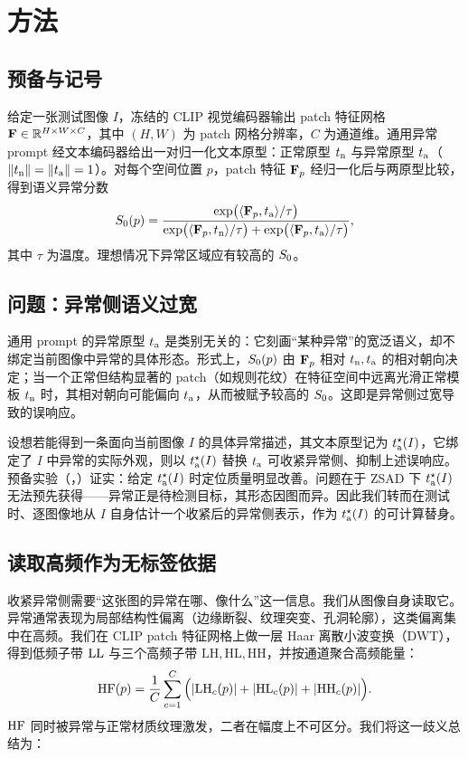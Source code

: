\section{方法}
\label{sec:method}

\subsection{预备与记号}
给定一张测试图像 $I$，冻结的 CLIP 视觉编码器输出 patch 特征网格 $\mathbf{F}\in\mathbb{R}^{H\times W\times C}$，其中 $(H,W)$ 为 patch 网格分辨率，$C$ 为通道维。通用异常 prompt 经文本编码器给出一对归一化文本原型：正常原型 $t_{\mathrm{n}}$ 与异常原型 $t_{\mathrm{a}}$（$\lVert t_{\mathrm{n}}\rVert=\lVert t_{\mathrm{a}}\rVert=1$）。对每个空间位置 $p$，patch 特征 $\mathbf{F}_p$ 经归一化后与两原型比较，得到语义异常分数
\begin{equation}
\label{eq:s0}
S_0(p)=\frac{\exp\!\big(\langle \mathbf{F}_p,t_{\mathrm{a}}\rangle/\tau\big)}
{\exp\!\big(\langle \mathbf{F}_p,t_{\mathrm{n}}\rangle/\tau\big)+\exp\!\big(\langle \mathbf{F}_p,t_{\mathrm{a}}\rangle/\tau\big)},
\end{equation}
其中 $\tau$ 为温度。理想情况下异常区域应有较高的 $S_0$。

\subsection{问题：异常侧语义过宽}
通用 prompt 的异常原型 $t_{\mathrm{a}}$ 是类别无关的：它刻画“某种异常”的宽泛语义，却不绑定当前图像中异常的具体形态。形式上，$S_0(p)$ 由 $\mathbf{F}_p$ 相对 $t_{\mathrm{n}},t_{\mathrm{a}}$ 的相对朝向决定；当一个正常但结构显著的 patch（如规则花纹）在特征空间中远离光滑正常模板 $t_{\mathrm{n}}$ 时，其相对朝向可能偏向 $t_{\mathrm{a}}$，从而被赋予较高的 $S_0$。这即是异常侧过宽导致的误响应。

设想若能得到一条面向当前图像 $I$ 的具体异常描述，其文本原型记为 $t_{\mathrm{a}}^{\star}(I)$，它绑定了 $I$ 中异常的实际外观，则以 $t_{\mathrm{a}}^{\star}(I)$ 替换 $t_{\mathrm{a}}$ 可收紧异常侧、抑制上述误响应。预备实验（，）证实：给定 $t_{\mathrm{a}}^{\star}(I)$ 时定位质量明显改善。问题在于 ZSAD 下 $t_{\mathrm{a}}^{\star}(I)$ 无法预先获得——异常正是待检测目标，其形态因图而异。因此我们转而在测试时、逐图像地从 $I$ 自身估计一个收紧后的异常侧表示，作为 $t_{\mathrm{a}}^{\star}(I)$ 的可计算替身。

\subsection{读取高频作为无标签依据}
收紧异常侧需要“这张图的异常在哪、像什么”这一信息。我们从图像自身读取它。异常通常表现为局部结构性偏离（边缘断裂、纹理突变、孔洞轮廓），这类偏离集中在高频。我们在 CLIP patch 特征网格上做一层 Haar 离散小波变换（DWT），得到低频子带 $\mathrm{LL}$ 与三个高频子带 $\mathrm{LH},\mathrm{HL},\mathrm{HH}$，并按通道聚合高频能量：
\begin{equation}
\label{eq:hf}
\mathrm{HF}(p)=\frac{1}{C}\sum_{c=1}^{C}\Big(|\mathrm{LH}_c(p)|+|\mathrm{HL}_c(p)|+|\mathrm{HH}_c(p)|\Big).
\end{equation}
$\mathrm{HF}$ 同时被异常与正常材质纹理激发，二者在幅度上不可区分。我们将这一歧义总结为：

